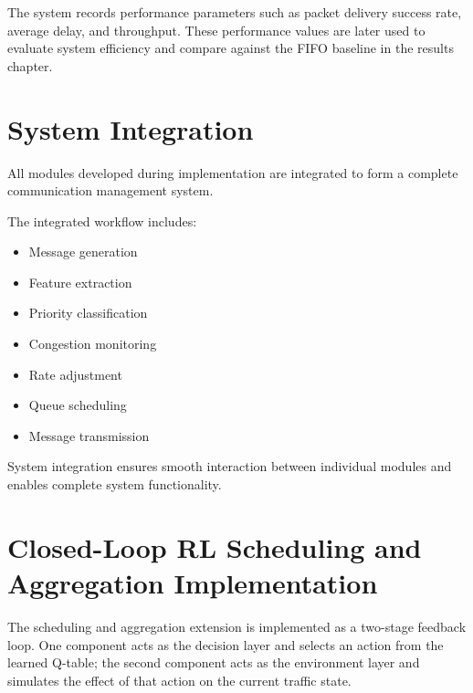 The system records performance parameters such as packet delivery 
success rate, average delay, and throughput. These performance 
values are later used to evaluate system efficiency and compare 
against the FIFO baseline in the results chapter.







\section{System Integration}

All modules developed during implementation are integrated 
to form a complete communication management system.

The integrated workflow includes:

\begin{itemize}

\item Message generation

\item Feature extraction

\item Priority classification

\item Congestion monitoring

\item Rate adjustment

\item Queue scheduling

\item Message transmission

\end{itemize}

System integration ensures smooth interaction between 
individual modules and enables complete system 
functionality.

\section{Closed-Loop RL Scheduling and Aggregation Implementation}

The scheduling and aggregation extension is implemented as a two-stage 
feedback loop. One component acts as the decision layer and selects an 
action from the learned Q-table; the second component acts as the 
environment layer and simulates the effect of that action on the current 
traffic state.


